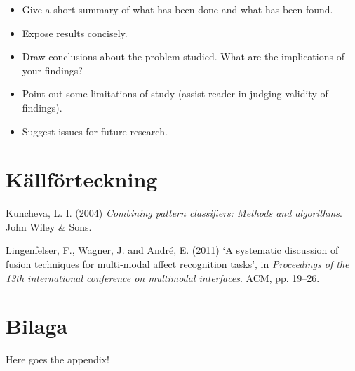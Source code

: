 \documentclass[a4paper,11pt]{article}
\newlength{\cslhangindent}
\newenvironment{CSLReferences}[2] %
 {%
  \setlength{\parindent}{0pt}
  \ifodd #1 \everypar{\setlength{\hangindent}{\cslhangindent}}\ignorespaces\fi
  \ifnum #2 > 0
  \setlength{\parskip}{#2\baselineskip}
  \fi
 }%
 {}
\begin{document}
\begin{itemize}
\item
  Give a short summary of what has been done and what has been found.
\item
  Expose results concisely.
\item
  Draw conclusions about the problem studied. What are the implications of your
  findings?
\item
  Point out some limitations of study (assist reader in judging validity of
  findings).
\item
  Suggest issues for future research.
\end{itemize}
\newpage

\hypertarget{kuxe4llfuxf6rteckning}{%
\section*{Källförteckning}\label{kuxe4llfuxf6rteckning}}

\noindent

\setlength{\parindent}{-0.5cm}
\setlength{\leftskip}{0.5cm}
\setlength{\parskip}{8pt}

\hypertarget{refs}{}
\begin{CSLReferences}{0}{0}
\leavevmode{}%
Kuncheva, L. I. (2004) \emph{Combining pattern classifiers: Methods and algorithms}. John Wiley \& Sons.

\leavevmode{}%
Lingenfelser, F., Wagner, J. and André, E. (2011) {`A systematic discussion of fusion techniques for multi-modal affect recognition tasks'}, in \emph{Proceedings of the 13th international conference on multimodal interfaces}. ACM, pp. 19--26.

\end{CSLReferences}
\indent
\setlength{\parindent}{17pt}
\setlength{\leftskip}{0pt}
\setlength{\parskip}{0pt}

\newpage

\appendix

\hypertarget{bilaga}{%
\section{Bilaga}\label{bilaga}}

Here goes the appendix!
\end{document}
